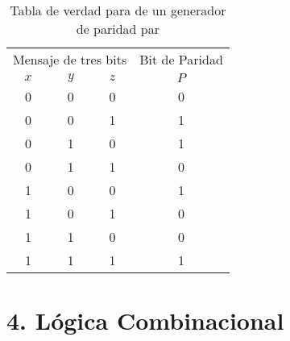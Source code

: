 \documentclass{article}
\begin{document}
\begin{table}[h]
    \centering
    \begin{tabular}{cccc}
        \multicolumn{3}{c}{Mensaje de tres bits} & Bit de Paridad \\
        \cmidrule{1-3} \cmidrule{4-4}
        $x$ & $y$ & $z$ & $P$ \\
        \midrule
        0 & 0 & 0 & 0 \\
        0 & 0 & 1 & 1 \\
        0 & 1 & 0 & 1 \\
        0 & 1 & 1 & 0 \\
        1 & 0 & 0 & 1 \\
        1 & 0 & 1 & 0 \\
        1 & 1 & 0 & 0 \\
        1 & 1 & 1 & 1 \\
        \bottomrule
    \end{tabular}
    \caption{Tabla de verdad para de un generador de paridad par}
\end{table}
\newpage

\section*{4. L\'{o}gica Combinacional}
\end{document}
